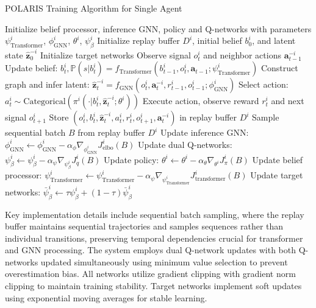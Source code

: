 \begin{algorithm}[!htbp]
\caption{POLARIS Training Algorithm for Single Agent}
\begin{algorithmic}[1]
\State Initialize belief processor, inference GNN, policy and Q-networks with parameters $\psi^i_{\text{Transformer}}$, $\phi^i_{\text{GNN}}$, $\theta^i$, $\psi^i_{\beta}$
\State Initialize replay buffer $D^i$, initial belief $b^i_0$, and latent state $\boldsymbol{\hat{z}}^{-i}_0$
\State Initialize target networks
    \State Observe signal $o^i_t$ and neighbor actions $\boldsymbol{a}^{-i}_{t-1}$
    \State Update belief: $b^i_t, \mathbb{P}(s|b^i_t) = f_{\text{Transformer}}(b^i_{t-1}, o^i_t, \boldsymbol{a}_{t-1}; \psi^i_{\text{Transformer}})$
    \State Construct graph and infer latent: $\boldsymbol{\hat{z}}^{-i}_t = f_{\text{GNN}}(o^i_t, \boldsymbol{a}^{-i}_t, r^i_{t-1}, o^i_{t-1}; \phi^i_{\text{GNN}})$
    \State Select action: $a^i_t \sim \text{Categorical}(\pi^i(\cdot|b^i_t, \boldsymbol{\hat{z}}^{-i}_t; \theta^i))$
    \State Execute action, observe reward $r^i_t$ and next signal $o^i_{t+1}$
    \State Store $(o^i_t, b^i_t, \boldsymbol{\hat{z}}^{-i}_t, a^i_t, r^i_t, o^i_{t+1}, \boldsymbol{a}^{-i}_t)$ in replay buffer $D^i$
        \State Sample sequential batch $B$ from replay buffer $D^i$
        \State Update inference GNN: $\phi^i_{\text{GNN}} \leftarrow \phi^i_{\text{GNN}} - \alpha_{\phi} \nabla_{\phi^i_{\text{GNN}}} J^i_{\text{elbo}}(B)$
        \State Update dual Q-networks: $\psi^i_{\beta} \leftarrow \psi^i_{\beta} - \alpha_{\psi} \nabla_{\psi^i_{\beta}} J^i_{q}(B)$
        \State Update policy: $\theta^i \leftarrow \theta^i - \alpha_{\theta} \nabla_{\theta^i} J^i_{\pi}(B)$
        \State Update belief processor: $\psi^i_{\text{Transformer}} \leftarrow \psi^i_{\text{Transformer}} - \alpha_{\psi} \nabla_{\psi^i_{\text{Transformer}}} J^i_{\text{transformer}}(B)$
        \State Update target networks: $\bar{\psi}^i_{\beta} \leftarrow \tau \psi^i_{\beta} + (1-\tau) \bar{\psi}^i_{\beta}$
    \EndIf
\EndFor
\end{algorithmic}
\end{algorithm}

Key implementation details include sequential batch sampling, where the replay buffer maintains sequential trajectories and samples sequences rather than individual transitions, preserving temporal dependencies crucial for transformer and GNN processing. The system employs dual Q-network updates with both Q-networks updated simultaneously using minimum value selection to prevent overestimation bias. All networks utilize gradient clipping with gradient norm clipping to maintain training stability. Target networks implement soft updates using exponential moving averages for stable learning.

